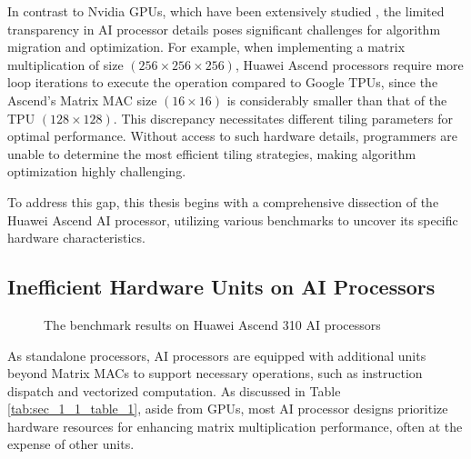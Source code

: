 In contrast to Nvidia GPUs, which have been extensively studied \cite{DBLP:journals/corr/abs-1804-06826, DBLP:conf/ppopp/ZhangTXLZC17, DBLP:conf/ics/ZhouTZWS17, DBLP:conf/ispass/RaihanGA19, DBLP:conf/pldi/HongSKRKPRS18, DBLP:conf/cgo/ZhouMSM21}, the limited transparency in AI processor details poses significant challenges for algorithm migration and optimization. For example, when implementing a matrix multiplication of size $(256 \times 256 \times 256)$, Huawei Ascend processors require more loop iterations to execute the operation compared to Google TPUs, since the Ascend's Matrix MAC size $(16 \times 16)$ is considerably smaller than that of the TPU $(128 \times 128)$. This discrepancy necessitates different tiling parameters for optimal performance. Without access to such hardware details, programmers are unable to determine the most efficient tiling strategies, making algorithm optimization highly challenging.

To address this gap, this thesis begins with a comprehensive dissection of the Huawei Ascend AI processor, utilizing various benchmarks to uncover its specific hardware characteristics.

\subsection{Inefficient Hardware Units on AI Processors \label{sec_1_2_2}}

\begin{figure}[tbp]
    \caption{The benchmark results on Huawei Ascend 310 AI processors}
    \label{fig:benchmark}
    \end{figure}

As standalone processors, AI processors are equipped with additional units beyond Matrix MACs to support necessary operations, such as instruction dispatch and vectorized computation. As discussed in Table \ref{tab:sec_1_1_table_1}, aside from GPUs, most AI processor designs prioritize hardware resources for enhancing matrix multiplication performance, often at the expense of other units.

